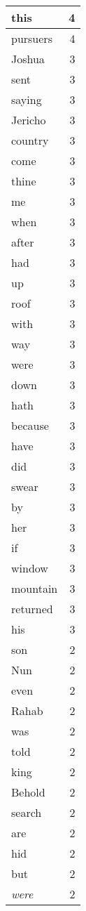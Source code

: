\begin{center}
\begin{longtable}{l|r}
this & 4 \\ \hline
pursuers & 4 \\ \hline
Joshua & 3 \\ \hline
sent & 3 \\ \hline
saying & 3 \\ \hline
Jericho & 3 \\ \hline
country & 3 \\ \hline
come & 3 \\ \hline
thine & 3 \\ \hline
me & 3 \\ \hline
when & 3 \\ \hline
after & 3 \\ \hline
had & 3 \\ \hline
up & 3 \\ \hline
roof & 3 \\ \hline
with & 3 \\ \hline
way & 3 \\ \hline
were & 3 \\ \hline
down & 3 \\ \hline
hath & 3 \\ \hline
because & 3 \\ \hline
have & 3 \\ \hline
did & 3 \\ \hline
swear & 3 \\ \hline
by & 3 \\ \hline
her & 3 \\ \hline
if & 3 \\ \hline
window & 3 \\ \hline
mountain & 3 \\ \hline
returned & 3 \\ \hline
his & 3 \\ \hline
son & 2 \\ \hline
Nun & 2 \\ \hline
even & 2 \\ \hline
Rahab & 2 \\ \hline
was & 2 \\ \hline
told & 2 \\ \hline
king & 2 \\ \hline
Behold & 2 \\ \hline
search & 2 \\ \hline
are & 2 \\ \hline
hid & 2 \\ \hline
but & 2 \\ \hline
\emph{were} & 2 \\ \hline

\end{longtable}
\end{center}
